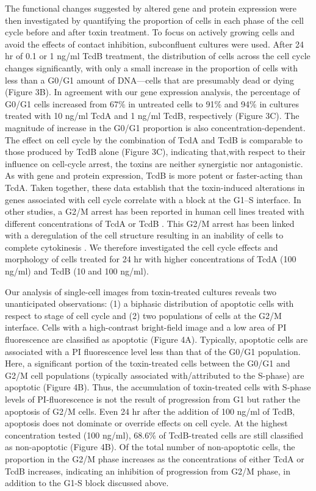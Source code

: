 The functional changes suggested by altered gene and protein expression were then investigated by quantifying the proportion of cells in each phase of the cell cycle before and after toxin treatment. To focus on actively growing cells and avoid the effects of contact inhibition, subconfluent cultures were used. After 24 hr of 0.1 or 1 ng/ml TcdB treatment, the distribution of cells across the cell cycle changes significantly, with only a small increase in the proportion of cells with less than a G0/G1 amount of DNA—cells that are presumably dead or dying (Figure 3B). In agreement with our gene expression analysis, the percentage of G0/G1 cells increased from 67\% in untreated cells to 91\% and 94\% in cultures treated with 10 ng/ml TcdA and 1 ng/ml TcdB, respectively (Figure 3C). The magnitude of increase in the G0/G1 proportion is also concentration-dependent. The effect on cell cycle by the combination of TcdA and TcdB is comparable to those produced by TcdB alone (Figure 3C), indicating that,with respect to their influence on cell-cycle arrest, the toxins are neither synergistic nor antagonistic. As with gene and protein expression, TcdB is more potent or faster-acting than TcdA. Taken together, these data establish that the toxin-induced alterations in genes associated with cell cycle correlate with a block at the G1–S interface. In other studies, a G2/M arrest has been reported in human cell lines treated with different concentrations of TcdA or TcdB \cite{Kim:2005jk, Gerhard:2008wz, Nottrott:2007ep}. This G2/M arrest has been linked with a deregulation of the cell structure resulting in an inability of cells to complete cytokinesis \cite{Huelsenbeck:2009di}. We therefore investigated the cell cycle effects and morphology of cells treated for 24 hr with higher concentrations of TcdA (100 ng/ml) and TcdB (10 and 100 ng/ml).

Our analysis of single-cell images from toxin-treated cultures reveals two unanticipated observations: (1) a biphasic distribution of apoptotic cells with respect to stage of cell cycle and (2) two populations of cells at the G2/M interface.  Cells with a high-contrast bright-field image and a low area of PI fluorescence are classified as apoptotic (Figure 4A). Typically, apoptotic cells are associated with a PI fluorescence level less than that of the G0/G1 population.  Here, a significant portion of the toxin-treated cells between the G0/G1 and G2/M cell populations (typically associated with/attributed to the S-phase) are apoptotic (Figure 4B). Thus, the accumulation of toxin-treated cells with S-phase levels of PI-fluorescence is not the result of progression from G1 but rather the apoptosis of G2/M cells. Even 24 hr after the addition of 100 ng/ml of TcdB, apoptosis does not dominate or override effects on cell cycle. At the highest concentration tested (100 ng/ml), 68.6\% of TcdB-treated cells are still classified as non-apoptotic (Figure 4B). Of the total number of non-apoptotic cells, the proportion in the G2/M phase increases as the concentrations of either TcdA or TcdB increases, indicating an inhibition of progression from G2/M phase, in addition to the G1-S block discussed above.

